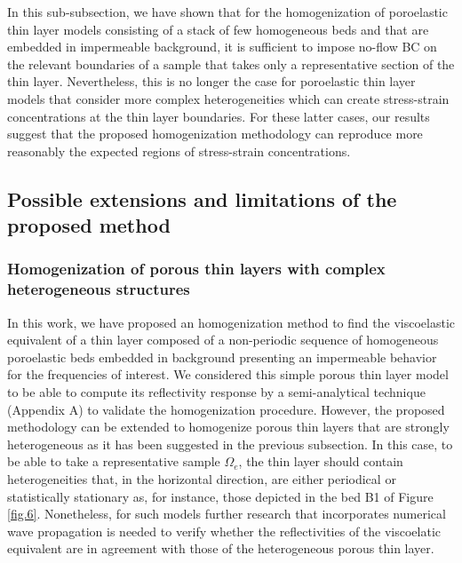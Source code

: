 \documentclass[draft]{agujournal2019}
\begin{document}
In this sub-subsection, we have shown that for the homogenization of poroelastic thin layer models consisting of a stack of few homogeneous beds and that are embedded in impermeable background, it is sufficient to impose no-flow BC on the relevant boundaries of a sample that takes only a representative section of the thin layer. Nevertheless, this is no longer the case for poroelastic thin layer models that consider more complex heterogeneities which can create stress-strain concentrations at the thin layer boundaries. For these latter cases, our results suggest that the proposed homogenization methodology can reproduce more reasonably the expected regions of stress-strain concentrations.

\subsection{Possible extensions and limitations of the proposed method}

\subsubsection{Homogenization of porous thin layers with complex heterogeneous structures}
In this work, we have proposed an homogenization method to find the viscoelastic equivalent of a thin layer composed of a non-periodic sequence of homogeneous poroelastic beds  embedded in background presenting an impermeable behavior for the frequencies of interest. We considered this simple porous thin layer model to be able to compute its reflectivity response by a semi-analytical technique (Appendix A) to validate the homogenization procedure. However, the proposed methodology  can be extended to homogenize porous thin layers that are strongly heterogeneous as it has been suggested in the previous subsection. In this case, to be able to take a representative sample $\Omega_e$, the thin layer should contain heterogeneities that, in the horizontal direction, are either periodical or statistically stationary as, for instance, those depicted in the bed B1 of Figure \ref{fig.6}. Nonetheless, for such models further research that incorporates numerical wave propagation is needed to verify whether the reflectivities of the viscoelatic equivalent are in agreement with those of the heterogeneous porous thin layer. 
\end{document}
